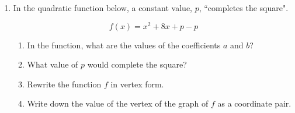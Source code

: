 \documentclass[12pt, twoside]{article}
\begin{document}
\begin{enumerate}
  \item In the quadratic function below, a constant value, $p$, ``completes the square".

  \[f(x) = x^2+8x+p-p\]

  \begin{enumerate}
    \item In the function, what are the values of the coefficients $a$ and $b$? \vspace{1cm}
    \item What value of $p$ would complete the square? \vspace{1cm}
    \item Rewrite the function $f$ in vertex form. \vspace{2cm}
    \item Write down the value of the vertex of the graph of $f$ as a coordinate pair.  \vspace{2cm}
  \end{enumerate}

  \end{enumerate}

  
\end{document}
